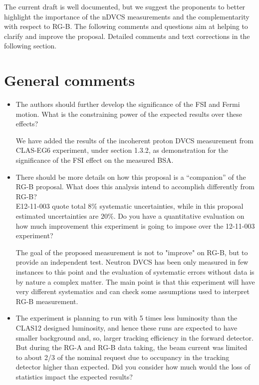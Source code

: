 The current draft is well documented, but we suggest the proponents to better 
highlight the importance of the nDVCS measurements and the complementarity with 
respect to RG-B.
The following comments and questions aim at helping to clarify and improve the 
proposal. Detailed comments and text corrections in the following section.
 
 
 \section*{General comments}
 
  \begin{itemize}
  
\item The authors should further develop the significance of the FSI and Fermi 
   motion. What is the constraining power of the expected results over these 
        effects?

{\color{red} We have added the results of the incoherent proton DVCS 
        measurement from CLAS-EG6 experiment, under section 1.3.2, as 
        demonstration for the significance of the FSI effect on the measured 
        BSA.}

\item There should be more details  on how this  proposal is a ``companion'' of 
   the RG-B proposal. What does this analysis intend to accomplish differently 
        from RG-B?  \\ E12-11-003 quote total $8\%$ systematic uncertainties, 
        while in this proposal estimated uncertainties are $20\%$. Do you have 
        a quantitative evaluation on how much improvement this experiment is 
        going to impose over the 12-11-003 experiment?

 {\color{red} The goal of the proposed measurement is not to "improve" on RG-B, 
        but to provide an independent test. Neutron DVCS has been only measured 
        in few instances to this point and the evaluation of systematic errors 
        without data is by nature a complex matter. The main point is that this 
        experiment will have very different systematics and can check some 
        assumptions used to interpret RG-B measurement.}
 
 \item The experiment is planning to run with 5 times less luminosity than the 
    CLAS12 designed luminosity, and hence these runs are expected to have 
        smaller background and, so, larger tracking efficiency in the forward 
        detector. But during the RG-A and RG-B data taking, the beam current 
        was limited to about 2/3 of the nominal request due to occupancy in the 
        tracking detector higher than expected. Did you consider how much would 
        the loss of statistics impact the expected results? 
 

\end{itemize}

